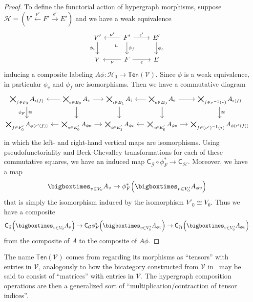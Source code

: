 \documentclass{article}
\theoremstyle{definition}
\theoremstyle{remark}
\def\G{\mathcal{G}}
\def\H{\mathcal{H}}
\def\V{\mathscr{V}}
\def\ten{\mathbb{T}\mathsf{en}}
\newcommand{\dlpullback}[1][dl]{\ar[#1,phantom,near start,"\llcorner"]}
\let\xto\xrightarrow
\let\xot\xleftarrow
\begin{document}
\begin{proof}
  To define the functorial action of hypergraph morphisms, suppose $\H = (V'\xot{\nu'} F' \xto{\epsilon'} E')$ and we have a weak equivalence
  \[
  \begin{tikzcd}
    V' \ar[d,"\phi_v"'] & F' \ar[d,"\phi_f"] \ar[r,"\epsilon'"] \ar[l,"\nu'"'] \dlpullback[dl] & E' \ar[d,"\phi_e"]\\
    V  & F \ar[r,"\epsilon"'] \ar[l,"\nu"] & E
  \end{tikzcd}
  \]
  inducing a composite labeling $A\phi : \H_0 \to \ten(\V)$.
  Since $\phi$ is a weak equivalence, in particular $\phi_v$ and $\phi_f$ are isomorphisms.
  Then we have a commutative diagram
  \[\hspace{-2cm}\small
  \begin{tikzcd}[column sep=small]
    \bigtimes_{f\in F_0} A_{\epsilon(f)} \ar[d,"\phi_F"',"\cong"] &
    \bigtimes_{e\in E_0} A_e \ar[l] \ar[r] \ar[d] &
    \bigtimes_{i\in E_1} A_{i} \ar[d] &
    \bigtimes_{e\in E_0} A_e \ar[l] \ar[r] \ar[d] &
    \bigtimes_{f\in \nu^{-1}(\ast)} A_{\epsilon(f)} \ar[d,"\cong"] \\
    \bigtimes_{f\in F'_0} A_{\phi(\epsilon'(f))}  &
    \bigtimes_{e\in E'_0} A_{\phi e} \ar[l] \ar[r]  &
    \bigtimes_{i\in E'_1} A_{\phi i}  &
    \bigtimes_{e\in E'_0} A_{\phi e} \ar[l] \ar[r]  &
    \bigtimes_{f\in (\nu')^{-1}(\ast)} A_{\phi(\epsilon'(f))} 
  \end{tikzcd}\hspace{-2cm}
  \]
  in which the left- and right-hand vertical maps are isomorphisms.
  Using pseudofunctoriality and Beck-Chevalley transformations for each of these commutative squares, we have an induced map $\mathsf{C}_\G \circ \phi_F^* \to \mathsf{C}_\H$.
  Moreover, we have a map
  \[ \bigboxtimes_{v\in V_0} A_v \to \phi_F^*\Big(\bigboxtimes_{v\in V'_0} A_{\phi v}\Big)\]
  that is simply the isomorphism induced by the isomorphism $V'_0 \cong V_0$.
  Thus we have a composite
  \[ \mathsf{C}_\G\Big( \bigboxtimes_{v\in V_0} A_v\Big)
  \to \mathsf{C}_\G\phi_F^*\Big(\bigboxtimes_{v\in V'_0} A_{\phi v}\Big)
  \to \mathsf{C}_\H\Big(\bigboxtimes_{v\in V'_0} A_{\phi v}\Big)
  \]
  from the composite of $A$ to the composite of $A\phi$.
\end{proof}

The name $\ten(\V)$ comes from regarding its morphisms as ``tensors'' with entries in $\V$, analogously to how the bicategory constructed from $\V$ in~\cite{shulman:frbi,ps:indexed} may be said to consist of ``matrices'' with entries in $\V$.
The hypergraph composition operations are then a generalized sort of ``multiplication/contraction of tensor indices''.
\end{document}

